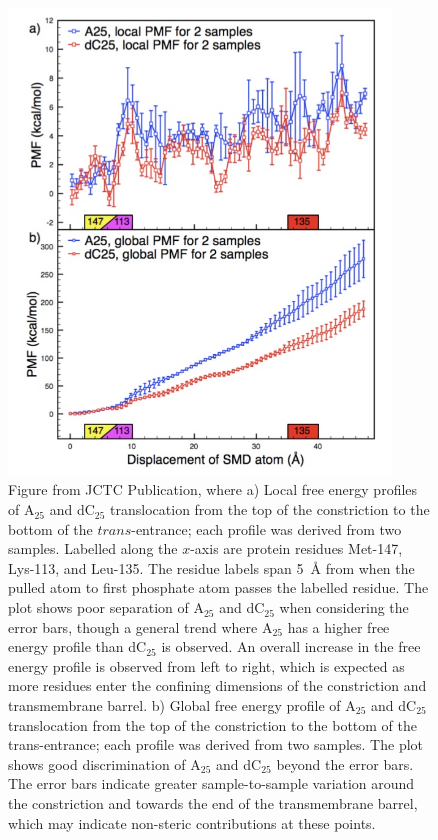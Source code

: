 \documentclass[a4paper,10pt]{article}
\newcommand{\dctf}{dC$_{25}$ }
\newcommand{\atf}{A$_{25}$ }
\begin{document}
\begin{figure}[!h]
  \begin{center}
    \includegraphics[width=4.0in]{full_trans_1every3_b}
  \end{center}
  \caption{Figure from JCTC Publication, where a) Local free energy profiles of \atf and \dctf translocation from the top of the constriction to the bottom of the $trans$-entrance; each profile was derived from two samples. Labelled along the $x$-axis are protein residues Met-147, Lys-113, and Leu-135.  The residue labels span 5~{\AA} from when the pulled atom to first phosphate atom passes the labelled residue. The plot shows poor separation of \atf and \dctf when considering the error bars, though a general trend where \atf has a higher free energy profile than \dctf is observed. An overall increase in the free energy profile is observed from left to right, which is expected as more residues enter the confining dimensions of the constriction and transmembrane barrel. b) Global free energy profile of \atf and \dctf translocation from the top of the constriction to the bottom of the trans-entrance; each profile was derived from two samples. The plot shows good discrimination of \atf and \dctf beyond the error bars. The error bars indicate greater sample-to-sample variation around the constriction and towards the end of the transmembrane barrel, which may indicate non-steric contributions at these points.}
  \label{full_trans_local}
\end{figure}
\end{document}
